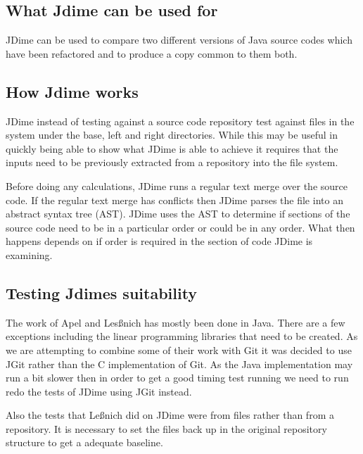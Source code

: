 \subsection{What Jdime can be used for}
JDime can be used to compare two different versions of Java source codes which have been refactored and to produce a copy common to them both. 

\subsection{How Jdime works}
JDime instead of testing against a source code repository test against files in the system under the base, left and right directories.
While this may be useful in quickly being able to show what JDime is able to achieve it requires that the inputs need to be previously extracted from a repository into the file system.

Before doing any calculations, JDime runs a regular text merge over the source code.  
If the regular text merge has conflicts then JDime parses the file into an abstract syntax tree (AST).  JDime uses the AST to determine if sections of the source code need to be in a particular order or could be in any order.
What then happens depends on if order is required in the section of code JDime is examining.

\subsection{Testing Jdimes suitability}
The work of Apel and Les{\ss}nich has mostly been done in Java.  There are a few exceptions including the linear programming libraries that need to be created.  As we are attempting to combine some of their work with Git it was decided to use JGit rather than the C implementation of Git. As the Java implementation may run a bit slower then in order to get a good timing test running we need to run redo the tests of JDime using JGit instead. 

Also the tests that Le{\ss}nich did on JDime were from files rather than from a repository. It is necessary to set the files back up in the original repository structure to get a adequate baseline.


